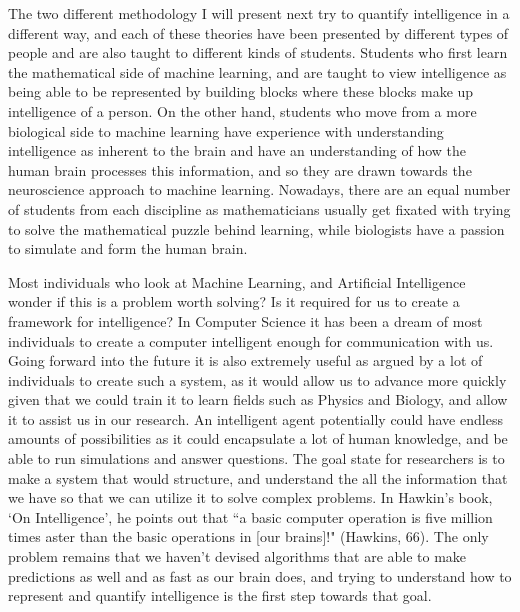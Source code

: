 \documentclass[11pt, oneside]{article}
\begin{document}
\par The two different methodology I will present next try to quantify intelligence in a different way, and each of these theories have been presented by different types of people and are also taught to different kinds of students. Students who first learn the mathematical side of machine learning, and are taught to view intelligence as being able to be represented by building blocks where these blocks make up intelligence of a person. On the other hand, students who move from a more biological side to machine learning have experience with understanding intelligence as inherent to the brain and have an understanding of how the human brain processes this information, and so they are drawn towards the neuroscience approach to machine learning. Nowadays, there are an equal number of students from each discipline as mathematicians usually get fixated with trying to solve the mathematical puzzle behind learning, while biologists have a passion to simulate and form the human brain.

\par Most individuals who look at Machine Learning, and Artificial Intelligence wonder if this is a problem worth solving? Is it required for us to create a framework for intelligence? In Computer Science it has been a dream of most individuals to create a computer intelligent enough for communication with us. Going forward into the future it is also extremely useful as argued by a lot of individuals to create such a system, as it would allow us to advance more quickly given that we could train it to learn fields such as Physics and Biology, and allow it to assist us in our research. An intelligent agent potentially could have endless amounts of possibilities as it could encapsulate a lot of human knowledge, and be able to run simulations and answer questions. The goal state for researchers is to make a system that would structure, and understand the all the information that we have so that we can utilize it to solve complex problems. In Hawkin's book, `On Intelligence', he points out that ``a basic computer operation is five million times aster than the basic operations in [our brains]!" (Hawkins, 66). The only problem remains that we haven't devised algorithms that are able to make predictions as well and as fast as our brain does, and trying to understand how to represent and quantify intelligence is the first step towards that goal. 

\end{document}
